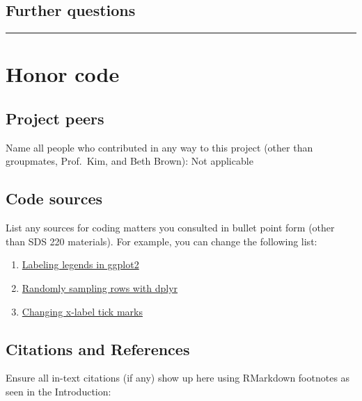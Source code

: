 \documentclass[
]{article}
\providecommand{\tightlist}{%
  \setlength{\itemsep}{0pt}\setlength{\parskip}{0pt}}
\begin{document}
\hypertarget{further-questions}{%
\subsection{Further questions}\label{further-questions}}

\begin{center}\rule{0.5\linewidth}{0.5pt}\end{center}

\hypertarget{honor-code}{%
\section{Honor code}\label{honor-code}}

\hypertarget{project-peers}{%
\subsection{Project peers}\label{project-peers}}

Name all people who contributed in any way to this project (other than
groupmates, Prof.~Kim, and Beth Brown): Not applicable

\hypertarget{code-sources}{%
\subsection{Code sources}\label{code-sources}}

List any sources for coding matters you consulted in bullet point form
(other than SDS 220 materials). For example, you can change the
following list:

\begin{enumerate}
\def\labelenumi{\arabic{enumi}.}
\tightlist
\item
  \href{https://www.datanovia.com/en/blog/ggplot-legend-title-position-and-labels/}{Labeling
  legends in ggplot2}
\item
  \href{https://www.datasciencemadesimple.com/select-random-samples-r-dplyr-sample_n-sample_frac/\#:~:text=Dplyr\%20package\%20in\%20R\%20is,the\%20random\%20N\%25\%20of\%20rows.}{Randomly
  sampling rows with dplyr}
\item
  \href{https://stackoverflow.com/questions/23564607/how-to-change-x-axis-tick-label-names-order-and-boxplot-colour-using-r-ggplot}{Changing
  x-label tick marks}
\end{enumerate}

\hypertarget{citations-and-references}{%
\subsection{Citations and References}\label{citations-and-references}}

Ensure all in-text citations (if any) show up here using RMarkdown
footnotes as seen in the Introduction:
\end{document}
